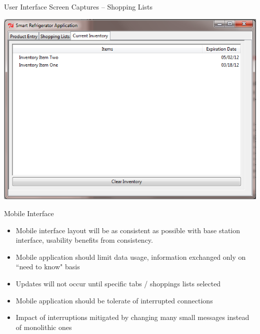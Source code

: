 \documentclass[t]{beamer}
\begin{document}
\begin{frame}{User Interface Screen Captures -- Shopping Lists}
\begin{center}
\includegraphics[scale=0.40]{../Graphics/Screenshot3}
\end{center}
\end{frame}

\begin{frame}{Mobile Interface}
\begin{itemize}
\item Mobile interface layout will be as consistent as possible with base station interface, usability benefits from consistency.
\item Mobile application should limit data usage, information exchanged only on ``need to know" basis
\item Updates will not occur until specific tabs / shoppings lists selected
\item Mobile application should be tolerate of interrupted connections
\item Impact of interruptions mitigated by changing many small messages instead of monolithic ones
\end{itemize}
\end{frame}
\end{document}
